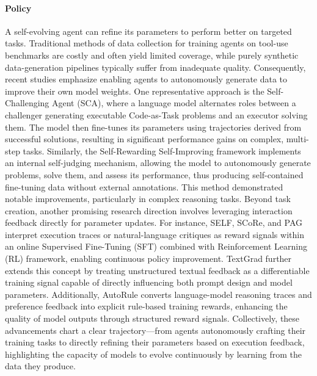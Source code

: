 \documentclass[10pt]{article} %
\begin{document}



\paragraph{Policy}
A self-evolving agent can refine its parameters to perform better on targeted tasks. Traditional methods of data collection for training agents on tool-use benchmarks are costly and often yield limited coverage, while purely synthetic data-generation pipelines typically suffer from inadequate quality. Consequently, recent studies emphasize enabling agents to autonomously generate data to improve their own model weights.
One representative approach is the Self-Challenging Agent (SCA)\citep{zhou2025selfchallenginglanguagemodelagents}, where a language model alternates roles between a challenger generating executable Code-as-Task problems and an executor solving them. The model then fine-tunes its parameters using trajectories derived from successful solutions, resulting in significant performance gains on complex, multi-step tasks. Similarly, the Self-Rewarding Self-Improving framework\citep{simonds2025selfrewardingselfimproving} implements an internal self-judging mechanism, allowing the model to autonomously generate problems, solve them, and assess its performance, thus producing self-contained fine-tuning data without external annotations. This method demonstrated notable improvements, particularly in complex reasoning tasks.
Beyond task creation, another promising research direction involves leveraging interaction feedback directly for parameter updates. For instance, SELF\citep{lu2023self}, SCoRe\citep{kumar2024training}, and PAG\citep{jiang2025pag} interpret execution traces or natural-language critiques as reward signals within an online Supervised Fine-Tuning (SFT) combined with Reinforcement Learning (RL) framework, enabling continuous policy improvement. TextGrad\citep{yellamraju2024textgrad} further extends this concept by treating unstructured textual feedback as a differentiable training signal capable of directly influencing both prompt design and model parameters. Additionally, AutoRule\citep{wang2025autorule} converts language-model reasoning traces and preference feedback into explicit rule-based training rewards, enhancing the quality of model outputs through structured reward signals. 
Collectively, these advancements chart a clear trajectory—from agents autonomously crafting their training tasks to directly refining their parameters based on execution feedback, highlighting the capacity of models to evolve continuously by learning from the data they produce.
\end{document}
